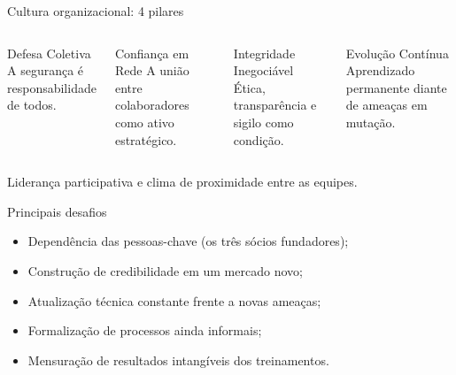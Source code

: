 \documentclass[aspectratio=169,12pt]{beamer}
\begin{document}
\begin{frame}{Cultura organizacional: 4 pilares}
  \begin{columns}[t]
      \begin{block}{Defesa Coletiva}
        A segurança é responsabilidade de todos.
      \end{block}
      \begin{block}{Confiança em Rede}
        A união entre colaboradores como ativo estratégico.
      \end{block}
      \begin{block}{Integridade Inegociável}
        Ética, transparência e sigilo como condição.
      \end{block}
      \begin{block}{Evolução Contínua}
        Aprendizado permanente diante de ameaças em mutação.
      \end{block}
  \end{columns}

  \vspace{0.2cm}
  Liderança participativa e clima de proximidade entre as equipes.
\end{frame}

\begin{frame}{Principais desafios}
  \begin{itemize}
    \item Dependência das pessoas-chave (os três sócios fundadores);
    \item Construção de credibilidade em um mercado novo;
    \item Atualização técnica constante frente a novas ameaças;
    \item Formalização de processos ainda informais;
    \item Mensuração de resultados intangíveis dos treinamentos.
  \end{itemize}
\end{frame}
\end{document}
